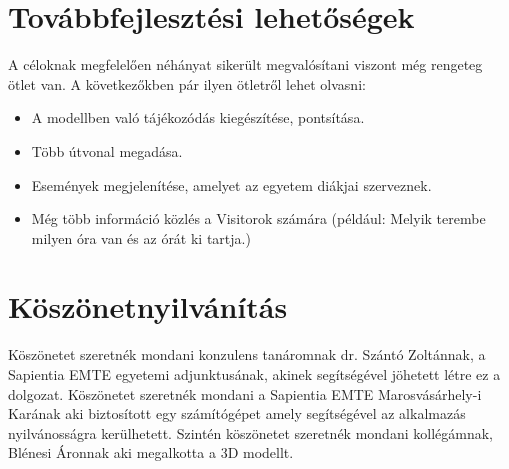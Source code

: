 \section{Továbbfejlesztési lehetőségek}
A céloknak megfelelően néhányat sikerült megvalósítani viszont még rengeteg ötlet van. A következőkben pár ilyen ötletről lehet olvasni:
\begin{itemize}
	\item A modellben való tájékozódás kiegészítése, pontsítása.
	\item Több útvonal megadása.
	\item Események megjelenítése, amelyet az egyetem diákjai szerveznek.
	\item Még több információ közlés a Visitorok számára (például: Melyik terembe milyen óra van és az órát ki tartja.)
\end{itemize}

\section{Köszönetnyilvánítás}

Köszönetet szeretnék mondani konzulens tanáromnak dr. Szántó Zoltánnak, a Sapientia EMTE egyetemi adjunktusának, akinek segítségével jöhetett létre ez a dolgozat. Köszönetet szeretnék mondani a Sapientia EMTE Marosvásárhely-i Karának aki biztosított egy számítógépet amely segítségével az alkalmazás nyilvánosságra kerülhetett. Szintén köszönetet szeretnék mondani kollégámnak, Blénesi Áronnak aki megalkotta a 3D modellt.